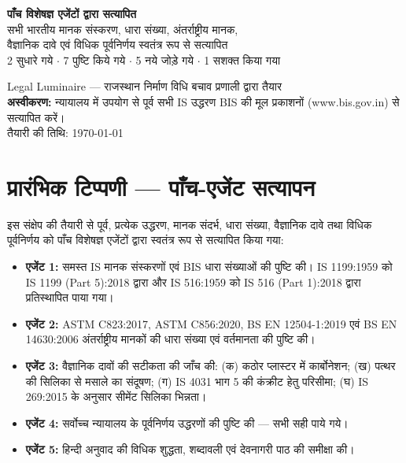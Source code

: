 \documentclass[12pt, a4paper]{article}
\begin{document}
\begin{titlepage}
  \vspace{0.8cm}
  \begin{criticalbox}
    \centering
    \textbf{\large पाँच विशेषज्ञ एजेंटों द्वारा सत्यापित}\\[4pt]
    \small सभी भारतीय मानक संस्करण, धारा संख्या, अंतर्राष्ट्रीय मानक,\\
    वैज्ञानिक दावे एवं विधिक पूर्वनिर्णय स्वतंत्र रूप से सत्यापित\\
    2 सुधारे गये $\cdot$ 7 पुष्टि किये गये $\cdot$ 5 नये जोड़े गये $\cdot$ 1 सशक्त किया गया
  \end{criticalbox}

  \vfill
  {\small\color{midgrey}Legal Luminaire --- राजस्थान निर्माण विधि बचाव प्रणाली द्वारा तैयार\\
  \textbf{अस्वीकरण:} न्यायालय में उपयोग से पूर्व सभी IS उद्धरण BIS की मूल प्रकाशनों (www.bis.gov.in) से सत्यापित करें।\\
  तैयारी की तिथि: \today}
\end{titlepage}

\tableofcontents
\newpage

\section*{प्रारंभिक टिप्पणी --- पाँच-एजेंट सत्यापन}

इस संक्षेप की तैयारी से पूर्व, प्रत्येक उद्धरण, मानक संदर्भ, धारा संख्या, वैज्ञानिक दावे तथा विधिक पूर्वनिर्णय को पाँच विशेषज्ञ एजेंटों द्वारा स्वतंत्र रूप से सत्यापित किया गया:

\begin{itemize}
  \item \textbf{एजेंट 1:} समस्त IS मानक संस्करणों एवं BIS धारा संख्याओं की पुष्टि की। IS 1199:1959 को IS 1199 (Part 5):2018 द्वारा और IS 516:1959 को IS 516 (Part 1):2018 द्वारा प्रतिस्थापित पाया गया।
  \item \textbf{एजेंट 2:} ASTM C823:2017, ASTM C856:2020, BS EN 12504-1:2019 एवं BS EN 14630:2006 अंतर्राष्ट्रीय मानकों की धारा संख्या एवं वर्तमानता की पुष्टि की।
  \item \textbf{एजेंट 3:} वैज्ञानिक दावों की सटीकता की जाँच की: (क) कठोर प्लास्टर में कार्बोनेशन; (ख) पत्थर की सिलिका से मसाले का संदूषण; (ग) IS 4031 भाग 5 की कंक्रीट हेतु परिसीमा; (घ) IS 269:2015 के अनुसार सीमेंट सिलिका भिन्नता।
  \item \textbf{एजेंट 4:} सर्वोच्च न्यायालय के पूर्वनिर्णय उद्धरणों की पुष्टि की --- सभी सही पाये गये।
  \item \textbf{एजेंट 5:} हिन्दी अनुवाद की विधिक शुद्धता, शब्दावली एवं देवनागरी पाठ की समीक्षा की।
\end{itemize}
\end{document}
